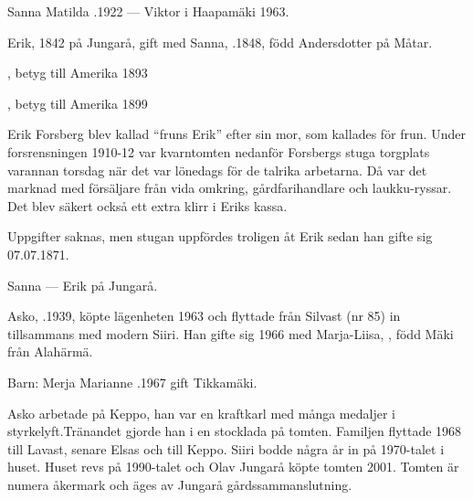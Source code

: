 Sanna Matilda .1922  ---  Viktor \textdied i  Haapamäki 1963.


Erik,  1842 på Jungarå, gift med Sanna, .1848, född Andersdotter på Måtar.
\begin{jhchildren}
  \item {}
  \item {}, betyg till Amerika 1893
  \item {}
  \item {}
  \item {}, betyg till Amerika 1899
  \item {}
\end{jhchildren}
Erik Forsberg blev kallad ``fruns Erik'' efter sin mor, som kallades för frun. Under forsrensningen 1910-12 var kvarntomten nedanför Forsbergs stuga torgplats varannan torsdag när det var lönedags för de talrika arbetarna. Då var det marknad med försäljare från vida omkring, gårdfarihandlare och laukku-ryssar. Det blev säkert också ett extra klirr i Eriks kassa.

Uppgifter saknas, men stugan uppfördes troligen åt Erik sedan han gifte sig 07.07.1871.

Sanna   ---  Erik  på Jungarå.






Asko, .1939, köpte lägenheten 1963 och flyttade från Silvast (nr 85) in tillsammans med modern Siiri. Han gifte sig 1966 med Marja-Liisa, , född Mäki från Alahärmä.

Barn: Merja Marianne .1967 gift Tikkamäki.

Asko arbetade på Keppo, han var en kraftkarl med många medaljer i styrkelyft.Tränandet gjorde han i en stocklada på tomten. Familjen flyttade 1968 till Lavast, senare Elsas och till Keppo. Siiri bodde några år in på 1970-talet i huset. Huset revs på 1990-talet och Olav Jungarå köpte tomten 2001. Tomten är numera åkermark och äges av Jungarå gårdssammanslutning.


